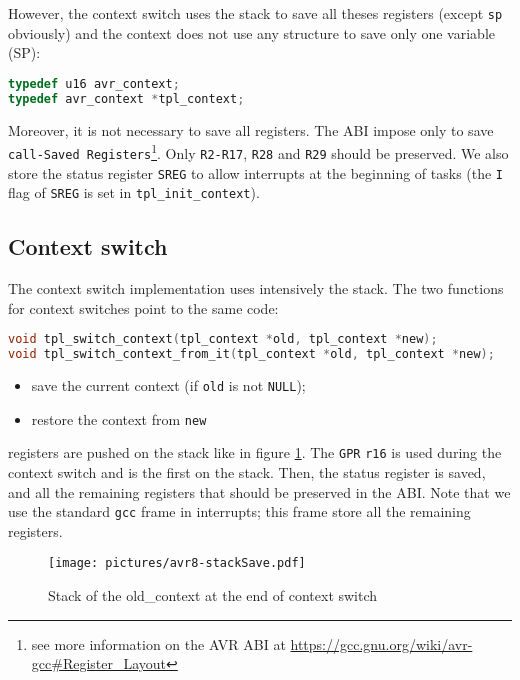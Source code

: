 However, the context switch uses the stack to save all theses registers (except \texttt{sp} obviously) and the context does not use any structure to save only one variable (SP):
\begin{lstlisting}[language=C]
typedef u16 avr_context;
typedef avr_context *tpl_context;
\end{lstlisting}

Moreover, it is not necessary to save all registers. The ABI impose only to save \texttt{call-Saved Registers}\footnote{see more information on the AVR ABI at \url{https://gcc.gnu.org/wiki/avr-gcc\#Register\_Layout}}. Only \texttt{R2-R17}, \texttt{R28} and \texttt{R29} should be preserved. We also store the status register \texttt{SREG} to allow interrupts at the beginning of tasks (the \texttt{I} flag of \texttt{SREG} is set in \texttt{tpl_init_context}).

\subsection{Context switch}
The context switch implementation uses intensively the stack. The two functions for context switches point to the same code:

\begin{lstlisting}[language=C]
void tpl_switch_context(tpl_context *old, tpl_context *new);
void tpl_switch_context_from_it(tpl_context *old, tpl_context *new);
\end{lstlisting}

\begin{itemize}
\item save the current context (if \texttt{old} is not \texttt{NULL});
\item restore the context from \texttt{new}
\end{itemize}

registers are pushed on the stack like in figure \ref{fig:avr8-stackSave}. The \texttt{GPR} \texttt{r16} is used during the context switch and is the first on the stack. Then, the status register is saved, and all the remaining registers that should be preserved in the ABI. Note that we use the standard \texttt{gcc} frame in interrupts; this frame store all the remaining registers.

\begin{figure}[htbp] %
\begin{minipage}{0.4\textwidth}
    \centering
  \texttt{[image: pictures/avr8-stackSave.pdf]} 
\end{minipage}
\begin{minipage}{0.6\textwidth}
  \caption{Stack of the old_context at the end of context switch}\label{fig:avr8-stackSave}
\end{minipage}
\end{figure}

